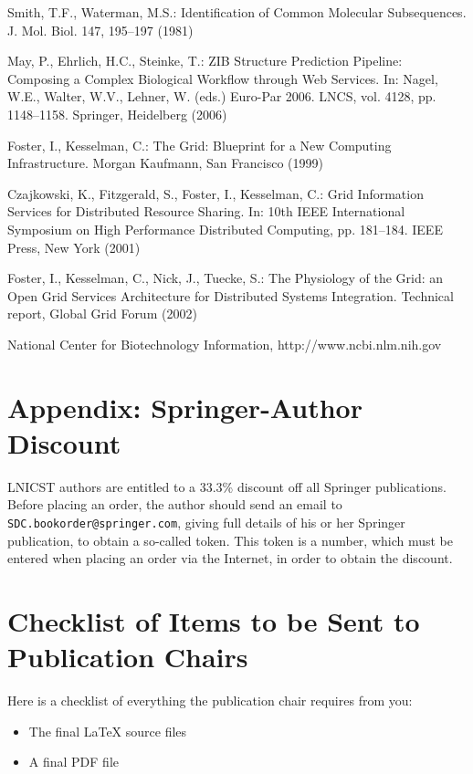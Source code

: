 \documentclass[lnicst,sechang,a4paper]{svmultln}
\begin{document}
\begin{thebibliography}{4}

 Smith, T.F., Waterman, M.S.: Identification of Common Molecular
Subsequences. J. Mol. Biol. 147, 195--197 (1981)

 May, P., Ehrlich, H.C., Steinke, T.: ZIB Structure Prediction Pipeline:
Composing a Complex Biological Workflow through Web Services. In: Nagel,
W.E., Walter, W.V., Lehner, W. (eds.) Euro-Par 2006. LNCS, vol. 4128,
pp. 1148--1158. Springer, Heidelberg (2006)

 Foster, I., Kesselman, C.: The Grid: Blueprint for a New Computing
Infrastructure. Morgan Kaufmann, San Francisco (1999)

 Czajkowski, K., Fitzgerald, S., Foster, I., Kesselman, C.: Grid
Information Services for Distributed Resource Sharing. In: 10th IEEE
International Symposium on High Performance Distributed Computing, pp.
181--184. IEEE Press, New York (2001)

 Foster, I., Kesselman, C., Nick, J., Tuecke, S.: The Physiology of the
Grid: an Open Grid Services Architecture for Distributed Systems
Integration. Technical report, Global Grid Forum (2002)

 National Center for Biotechnology Information, http://www.ncbi.nlm.nih.gov

\end{thebibliography}


\section*{Appendix: Springer-Author Discount}

LNICST authors are entitled to a 33.3\% discount off all Springer
publications. Before placing an order, the author should send an email
to \texttt{SDC.bookorder@springer.com}, giving full
details of his or her
Springer publication, to obtain a so-called token. This token is a
number, which must be entered when placing an order via the Internet, in
order to obtain the discount.

\section{Checklist of Items to be Sent to Publication Chairs}
Here is a checklist of everything the publication chair requires from you:

\setlength{\svitemindent}{8mm}
\begin{itemize}
\itemsep8pt\relax
\renewcommand\labelitemi{{\lower1.5pt\hbox{\Large$\square$}}}

\item The final \LaTeX{} source files
\item A final PDF file
\end{itemize}
\end{document}
